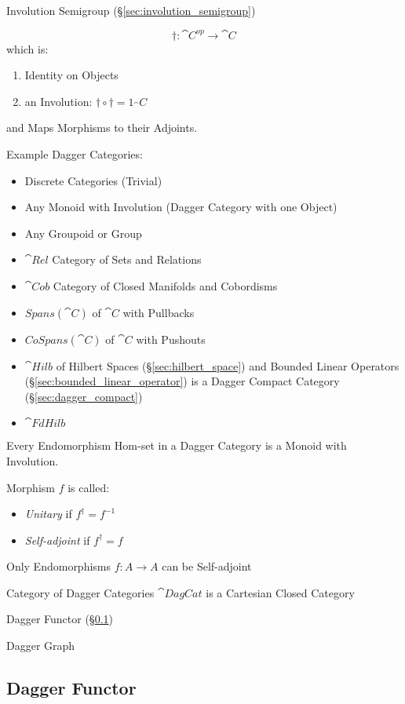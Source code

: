 Involution Semigroup (\S\ref{sec:involution_semigroup})

\[
  \dag : \cat{C}^{op} \rightarrow \cat{C}
\]
which is:
\begin{enumerate}
  \item Identity on Objects
  \item an Involution: $\dag \circ \dag = 1_\cat{C}$
\end{enumerate}
and Maps Morphisms to their Adjoints. %

Example Dagger Categories:
\begin{itemize}
  \item Discrete Categories (Trivial)
  \item Any Monoid with Involution (Dagger Category with one Object)
  \item Any Groupoid or Group
  \item $\cat{Rel}$ Category of Sets and Relations
  \item $\cat{Cob}$ Category of Closed Manifolds and Cobordisms
  \item $Spans(\cat{C})$ of $\cat{C}$ with Pullbacks
  \item $CoSpans(\cat{C})$ of $\cat{C}$ with Pushouts
  \item $\cat{Hilb}$ of Hilbert Spaces (\S\ref{sec:hilbert_space}) and
    Bounded Linear Operators (\S\ref{sec:bounded_linear_operator}) is
    a Dagger Compact Category (\S\ref{sec:dagger_compact})
  \item $\cat{FdHilb}$
\end{itemize}

Every Endomorphism Hom-set in a Dagger Category is a Monoid with
Involution.

Morphism $f$ is called:
\begin{itemize}
  \item \emph{Unitary} if $f^\dag = f^{-1}$
  \item \emph{Self-adjoint} if $f^\dag = f$
\end{itemize}

Only Endomorphisms $f : A \rightarrow A$ can be Self-adjoint

Category of Dagger Categories $\cat{DagCat}$ is a Cartesian Closed
Category

Dagger Functor (\S\ref{sec:dagger_functor})

Dagger Graph %



\subsection{Dagger Functor}\label{sec:dagger_functor}

